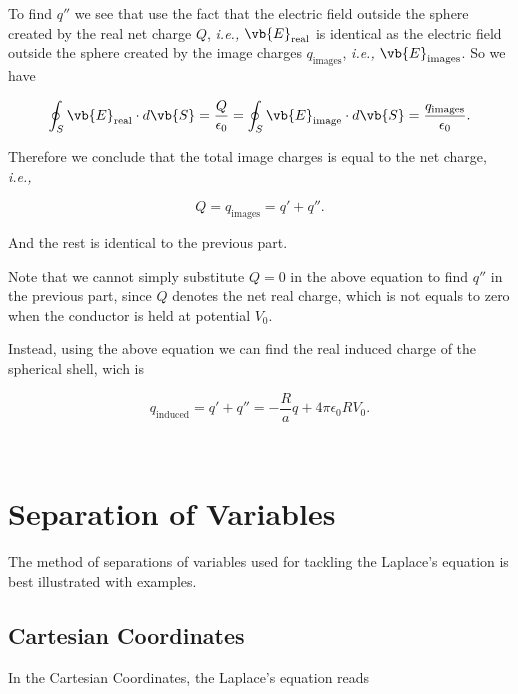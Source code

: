 \documentclass[english,a4paper,12pt]{report}
\begin{document}
{\begin{enumerate}
    To find \(q''\) we see that use the fact that the electric field outside the sphere created by the real net charge \(Q\), \textit{i.e.,} \(\vb{E} _{\text{real} } \) is identical as the electric field outside the sphere created by the image charges \(q_{\text{images} } \), \textit{i.e.,} \(\vb{E} _{\text{images} } \). So we have
    
    \begin{equation}
        \oint _{S} \vb{E}_{\text{real}}  \cdot d\vb{S} = \frac{Q}{\epsilon_0} = \oint _{S} \vb{E} _{\text{image}} \cdot d\vb{S} = \frac{q_{\text{images}}}{\epsilon_0} .
    \end{equation}
    
    Therefore we conclude that the total image charges is equal to the net charge, \textit{i.e.,} 
    
    \begin{equation}
        Q = q_{\text{images} } = q' + q''.
    \end{equation}
    
    And the rest is identical to the previous part.

    Note that we cannot simply substitute \(Q = 0\) in the above equation to find \(q''\) in the previous part, since \(Q \) denotes the net real charge, which is not equals to zero when the conductor is held at potential \(V_0 \). 

    Instead, using the above equation we can find the real induced charge of the spherical shell, wich is 

    \begin{equation}
        q_{\text{induced} } = q'+q'' = -\frac{R}{a} q + 4\pi \epsilon_0 RV_0 .   
    \end{equation}
\end{enumerate}~} 

\section{Separation of Variables}

The method of separations of variables used for tackling the Laplace's equation is best illustrated with examples.

\subsection{Cartesian Coordinates}

In the Cartesian Coordinates, the Laplace's equation reads
    
\end{document}
